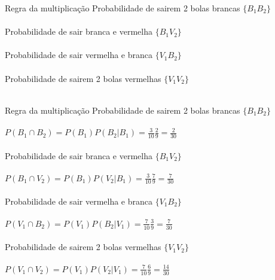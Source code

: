 \documentclass[10pt]{beamer}\usepackage[]{graphicx}\usepackage[]{color}
\theoremstyle{definition}
\begin{document}
\begin{frame}[fragile]{Regra da multiplicação} %
  Probabilidade de sairem 2 bolas brancas $\{B_1B_2\}$ \\~\\
  \vspace{1em}
  Probabilidade de sair branca e vermelha $\{B_1V_2\}$ \\~\\
    \vspace{1em}
  Probabilidade de sair vermelha e branca $\{V_1B_2\}$ \\~\\
    \vspace{1em}
    Probabilidade de sairem 2 bolas vermelhas $\{V_1V_2\}$ \\~\\
\end{frame}

\begin{frame}[fragile]{Regra da multiplicação} %
  Probabilidade de sairem 2 bolas brancas $\{B_1B_2\}$ \\~\\
  $P(B_1 \cap B_2) = P(B_1)P(B_2|B_1)  = \frac{3}{10} \frac{2}{9}
  = \frac{2}{30}$ \\~\\
  Probabilidade de sair branca e vermelha $\{B_1V_2\}$ \\~\\
  $P(B_1 \cap V_2) = P(B_1)P(V_2|B_1)  = \frac{3}{10} \frac{7}{9}
  = \frac{7}{30}$ \\~\\
  Probabilidade de sair vermelha e branca $\{V_1B_2\}$ \\~\\
  $P(V_1 \cap B_2) = P(V_1)P(B_2|V_1)  = \frac{7}{10} \frac{3}{9}
  = \frac{7}{30}$ \\~\\
    Probabilidade de sairem 2 bolas vermelhas $\{V_1V_2\}$ \\~\\
  $P(V_1 \cap V_2) = P(V_1)P(V_2|V_1)  = \frac{7}{10} \frac{6}{9}
  = \frac{14}{30}$
\end{frame}
\end{document}

